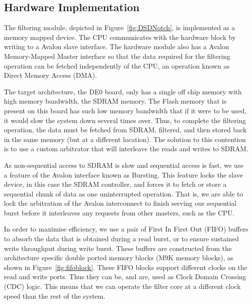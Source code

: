 \documentclass[]{article}
\begin{document}
\subsection{Hardware Implementation} %
\label{sub:hardware_implementation}




The filtering module, depicted in Figure~\ref{fig:DSDNotch}, is implemented as a memory mapped device. The CPU communicates with the hardware block by writing to a Avalon slave interface.
The hardware module also has a Avalon Memory-Mapped Master interface so that the data required for the filtering operation can be fetched independently of the CPU, an operation known as Direct Memory Access (DMA).

The target architecture, the DE0 board, only has a single off chip memory with high memory bandwidth, the SDRAM memory. The Flash memory that is present on this board has such low memory bandwidth that if it were to be used, it would slow the system down several times over.
Thus, to complete the filtering operation, the data must be fetched from SDRAM, filtered, and then stored back in the same memory (but at a different location). The solution to this contention is to use a custom arbitrator that will interleave the reads and writes to SDRAM.

As non-sequential access to SDRAM is slow and sequential access is fast, we use a feature of the Avalon interface known as Bursting. This feature locks the slave device, in this case the SDRAM controller, and forces it to fetch or store a sequential chunk of data as one uninterrupted operation.
That is, we are able to lock the arbitration of the Avalon interconnect to finish serving our sequential burst before it interleaves any requests from other masters, such as the CPU.

In order to maximise efficiency, we use a pair of First In First Out (FIFO) buffers to absorb the data that is obtained during a read burst, or to ensure sustained write throughput during write burst.
These buffers are constructed from the architecture specific double ported memory blocks (M9K memory blocks), as shown in Figure~\ref{fig:fifoblock}.
These FIFO blocks support different clocks on the read and write ports. Thus they can be, and are, used as Clock Domain Crossing (CDC) logic. This means that we can operate the filter core at a different clock speed than the rest of the system.
\end{document}
